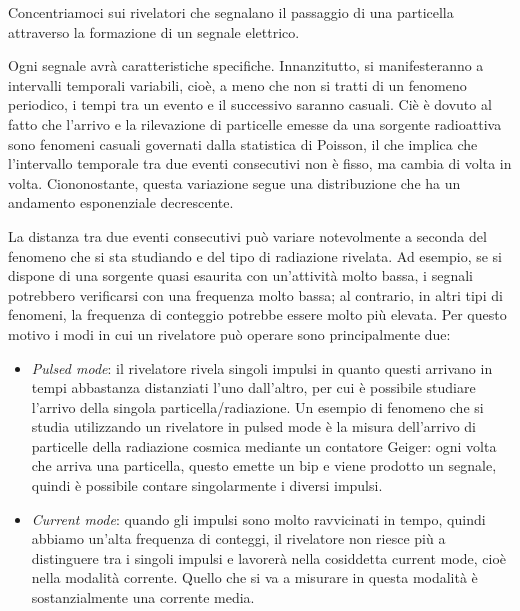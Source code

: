 Concentriamoci sui rivelatori che segnalano il passaggio di una particella attraverso la formazione di un segnale elettrico.

\begin{figure}[H]
   \centering
\end{figure}

Ogni segnale avrà caratteristiche specifiche. Innanzitutto, si manifesteranno a intervalli temporali variabili, cioè, a meno che non si tratti di un fenomeno periodico, i tempi tra un evento e il successivo saranno casuali. Ciè è dovuto al fatto che l'arrivo e la rilevazione di particelle emesse da una sorgente radioattiva sono fenomeni casuali governati dalla statistica di Poisson, il che implica che l'intervallo temporale tra due eventi consecutivi non è fisso, ma cambia di volta in volta. Ciononostante, questa variazione segue una distribuzione che ha un andamento esponenziale decrescente.

La distanza tra due eventi consecutivi può variare notevolmente a seconda del fenomeno che si sta studiando e del tipo di radiazione rivelata. Ad esempio, se si dispone di una sorgente quasi esaurita con un'attività molto bassa, i segnali potrebbero verificarsi con una frequenza molto bassa; al contrario, in altri tipi di fenomeni, la frequenza di conteggio potrebbe essere molto più elevata. Per questo motivo i modi in cui un rivelatore può operare sono principalmente due:

\begin{itemize}[leftmargin=0.5cm]
   \item \textit{Pulsed mode}: il rivelatore rivela singoli impulsi in quanto questi arrivano in tempi abbastanza distanziati l'uno dall'altro, per cui è possibile studiare l'arrivo della singola particella/radiazione. Un esempio di fenomeno che si studia utilizzando un rivelatore in pulsed mode è la misura dell'arrivo di particelle della radiazione cosmica mediante un contatore Geiger: ogni volta che arriva una particella, questo emette un bip e viene prodotto un segnale, quindi è possibile contare singolarmente i diversi impulsi.
   \item \textit{Current mode}: quando gli impulsi sono molto ravvicinati in tempo, quindi abbiamo un'alta frequenza di conteggi, il rivelatore non riesce più a distinguere tra i singoli impulsi e lavorerà nella cosiddetta current mode, cioè nella modalità corrente. Quello che si va a misurare in questa modalità è sostanzialmente una corrente media.
\end{itemize}

